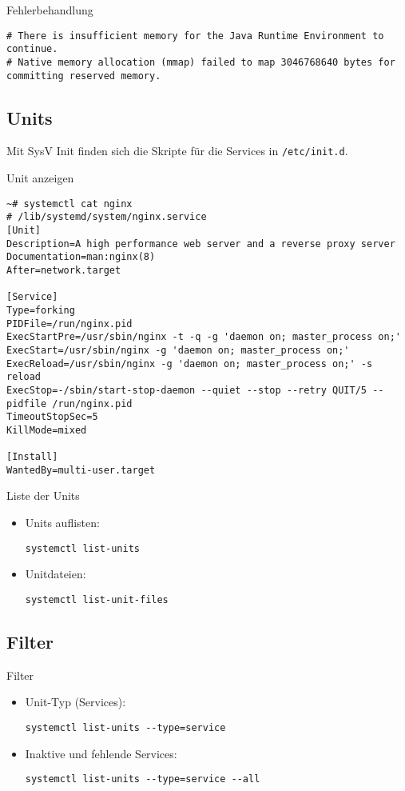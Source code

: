 \begin{frame}[fragile]{Fehlerbehandlung}
\begin{lstlisting}
# There is insufficient memory for the Java Runtime Environment to continue.
# Native memory allocation (mmap) failed to map 3046768640 bytes for committing reserved memory.
\end{lstlisting}
\end{frame}

\subsection{Units}

Mit SysV Init finden sich die Skripte für die Services in \verb|/etc/init.d|.

\begin{frame}[fragile]{Unit anzeigen}
\begin{lstlisting}
~# systemctl cat nginx
# /lib/systemd/system/nginx.service
[Unit]
Description=A high performance web server and a reverse proxy server
Documentation=man:nginx(8)
After=network.target

[Service]
Type=forking
PIDFile=/run/nginx.pid
ExecStartPre=/usr/sbin/nginx -t -q -g 'daemon on; master_process on;'
ExecStart=/usr/sbin/nginx -g 'daemon on; master_process on;'
ExecReload=/usr/sbin/nginx -g 'daemon on; master_process on;' -s reload
ExecStop=-/sbin/start-stop-daemon --quiet --stop --retry QUIT/5 --pidfile /run/nginx.pid
TimeoutStopSec=5
KillMode=mixed

[Install]
WantedBy=multi-user.target
\end{lstlisting}
\end{frame}

\begin{frame}[fragile]{Liste der Units}
  \begin{itemize}
    \item
Units auflisten:

    \verb|systemctl list-units|
    \item
Unitdateien:

\verb|systemctl list-unit-files|
  \end{itemize}
\end{frame}

\subsection{Filter}

\begin{frame}[fragile]{Filter}
  \begin{itemize}
    \item
	    Unit-Typ (Services):

    \verb|systemctl list-units --type=service|

\item
	Inaktive und fehlende Services:

    \verb|systemctl list-units --type=service --all|
  \end{itemize}
\end{frame}

